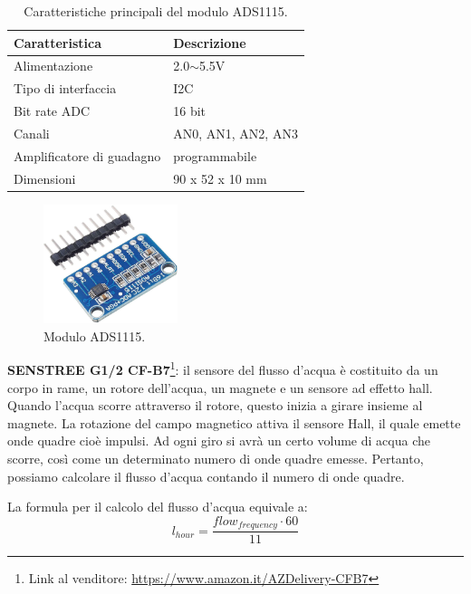 \begin{table}[H]
    \centering
    \begin{tabular}{|l|l|}
    \hline
    \textbf{Caratteristica}   & \textbf{Descrizione} \\ \hline
    Alimentazione             & 2.0$\sim$5.5V        \\ \hline
    Tipo di interfaccia       & I2C                  \\ \hline
    Bit rate ADC              & 16 bit               \\ \hline
    Canali                    & AN0, AN1, AN2, AN3   \\ \hline
    Amplificatore di guadagno & programmabile        \\ \hline
    Dimensioni                & 90 x 52 x 10 mm      \\ \hline
    \end{tabular}
    \caption{\label{ADS1115-features}Caratteristiche principali del modulo ADS1115.}
\end{table}

\begin{figure}[H]
    \centering
    \includegraphics[width=0.35\textwidth]{images/sensors/ads1115.png}\hfill
    \caption{Modulo ADS1115.}
\end{figure}

\textbf{SENSTREE G1/2 CF-B7}\footnote{Link al venditore: \href{https://www.amazon.it/Interruttore-Misuratore-Contatore-Flussometro-Temperatura/dp/B07QNMZ7ZK}{https://www.amazon.it/AZDelivery-CFB7}}: il sensore del flusso d'acqua è costituito da un corpo in rame, un rotore dell'acqua, un magnete e un sensore ad effetto hall. Quando l'acqua scorre attraverso il rotore, questo inizia a girare insieme al magnete. La rotazione del campo magnetico attiva il sensore Hall, il quale emette onde quadre cioè impulsi. Ad ogni giro si avrà un certo volume di acqua che scorre, così come un determinato numero di onde quadre emesse. Pertanto, possiamo calcolare il flusso d'acqua contando il numero di onde quadre.

La formula per il calcolo del flusso d'acqua equivale a:
\[l_{hour} = \frac{flow_{frequency} \cdot 60}{11}\]


